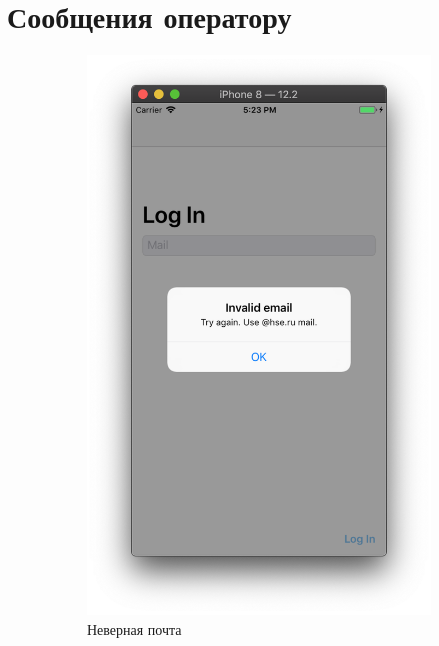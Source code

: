 \documentclass[a4paper,12pt]{article}
\begin{document}
	\section{Сообщения оператору}
	\begin{figure}[h!]
		\centering
		\begin{subfigure}[b]{0.3\linewidth}
			\includegraphics[width=\linewidth]{../includes/ro/invalid.png}
			\caption{\label{pic: invalid} Неверная почта}
		\end{subfigure}
		\begin{subfigure}[b]{0.3\linewidth}

\end{subfigure}
\end{figure}
\end{document}
